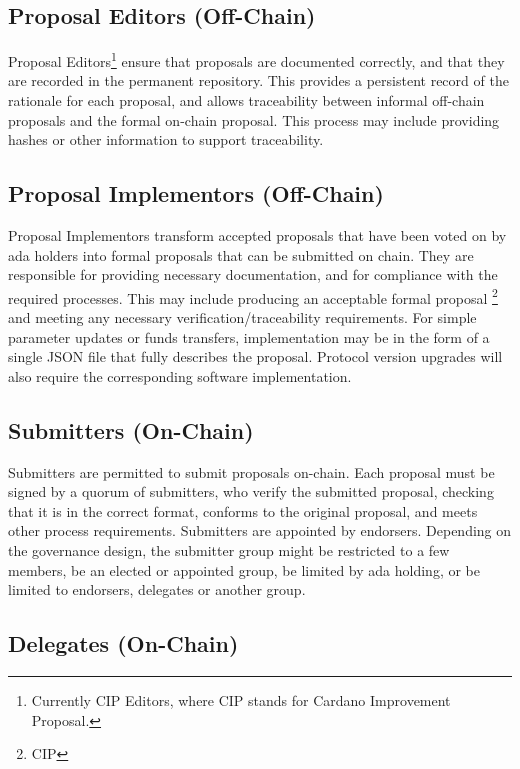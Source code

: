 \subsection{Proposal Editors (Off-Chain)}

Proposal Editors\footnote{Currently CIP Editors, where CIP stands for Cardano Improvement Proposal.} ensure that proposals are documented correctly, and that they are recorded in the
permanent repository.
This provides a persistent record of the rationale for each proposal, and allows traceability between informal off-chain
proposals and the formal on-chain proposal.  This process may include providing hashes or other information to support traceability.

\subsection{Proposal Implementors (Off-Chain)}

Proposal Implementors transform accepted proposals that have been voted on by ada holders into formal proposals that can be submitted on chain.
They are responsible for providing necessary documentation, and for compliance with the required processes.  This may include producing an acceptable formal proposal
\footnote{CIP}
and meeting any necessary verification/traceability requirements.  For simple parameter updates or funds transfers, implementation may be in the form of a single JSON
file that fully describes the proposal. Protocol version upgrades will also require the corresponding software implementation.

\subsection{Submitters (On-Chain)}

Submitters are permitted to submit proposals on-chain.  Each proposal must be signed by a quorum of submitters, who verify the submitted
proposal, checking that it is in the correct format, conforms to the original proposal, and meets other process requirements.
Submitters are appointed by endorsers.  Depending on the governance design, the submitter group might be restricted to a few members,
be an elected or appointed group, be limited by ada holding, or be limited to endorsers, delegates or another group.

\subsection{Delegates (On-Chain)}

